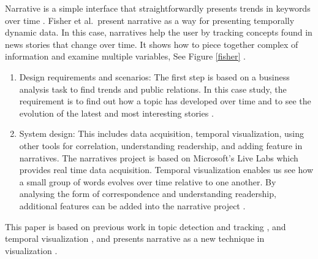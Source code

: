 \documentclass{egpubl}
\begin{document}

Narrative is a simple interface that straightforwardly presents trends in keywords over time \cite{fisher}.
 Fisher et al.\ present narrative as a way for presenting temporally dynamic data. In this case, narratives help the user by tracking concepts found in news stories that change over time. It shows how to piece together complex of information and examine multiple variables, See Figure \ref{fisher} \cite{fisher}.
\begin{enumerate}
\item Design requirements and scenarios: The first step is based on a business analysis task to find trends and public relations. In this case study, the requirement is to find out how a topic has developed over time and to see the evolution of the latest and most interesting stories \cite{fisher}.
\item System design: This includes data acquisition, temporal visualization, using other tools for correlation, understanding readership, and adding feature in narratives. The narratives project is based on Microsoft's Live Labs which provides real time data acquisition. Temporal visualization enables us see how a small group of words evolves over time relative to one another. By analysing the form of correspondence and understanding readership, additional features can be added into the narrative project \cite{fisher}.
\end{enumerate}
This paper is based on previous work in topic detection and tracking\cite{dubinko2007} \cite{russell2000}, and temporal visualization \cite{van1999}, and presents narrative as a new technique in visualization \cite{fisher}.
\end{document}
